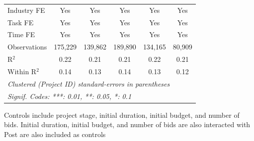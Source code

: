 \documentclass[
]{article}
\begin{document}
\begin{table}[htbp]
\begin{tabular}{lccccc}
      Industry FE                  & Yes                                                                                           & Yes                                           & Yes                                         & Yes                                                            & Yes\\  
      Task FE                      & Yes                                                                                           & Yes                                           & Yes                                         & Yes                                                            & Yes\\  
      Time FE                      & Yes                                                                                           & Yes                                           & Yes                                         & Yes                                                            & Yes\\  
      Observations                 & 175,229                                                                                       & 139,862                                       & 189,890                                     & 134,165                                                        & 80,909\\  
      R$^2$                        & 0.22                                                                                          & 0.21                                          & 0.21                                        & 0.22                                                           & 0.21\\  
      Within R$^2$                 & 0.14                                                                                          & 0.13                                          & 0.14                                        & 0.13                                                           & 0.12\\  
      \midrule
      \multicolumn{6}{l}{\emph{Clustered (Project ID) standard-errors in parentheses}}\\
      \multicolumn{6}{l}{\emph{Signif. Codes: ***: 0.01, **: 0.05, *: 0.1}}\\
   \end{tabular}
   
   \par \raggedright 
   Controls include project stage, initial duration, initial budget, and number of bids. Initial duration, initial budget, and number of bids are also interacted with Post are also included as controls
\end{table}
\end{document}
